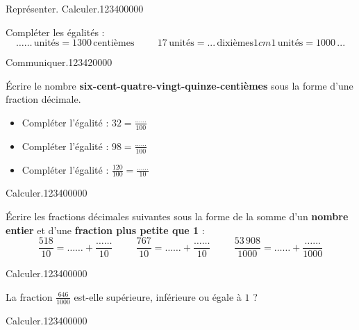 \begin{pageAD} 
 

\begin{ExoCad}{Représenter. Calculer.}{1234}{0}{0}{0}{0}{0}


 Compléter les égalités :
$$ \ldots\ldots\,\text{unités}= 1300\, \text{centièmes}\hspace{1cm}17 \,\text{unités}=...\,\text{dixièmes}{1cm}1\,\text{unités}=1000\,...$$


 
\end{ExoCad}

 
  
\begin{ExoCad}{Communiquer.}{1234}{2}{0}{0}{0}{0}

Écrire le nombre \textbf{six-cent-quatre-vingt-quinze-centièmes} sous la forme d'une fraction décimale.
 
 \begin{itemize}
 \item Compléter l'égalité : $32=\frac{\ldots\ldots}{100}$ \vspace{0.2cm}
 \item Compléter l'égalité :  $98=\frac{\ldots\ldots}{100}$\vspace{0.2cm}
 \item Compléter l'égalité :  $\frac{120}{100}=\frac{\ldots\ldots}{10}$\vspace{0.2cm}
 \end{itemize}
 
\end{ExoCad}

 

\begin{ExoCad}{Calculer.}{1234}{0}{0}{0}{0}{0}
 
 Écrire les fractions décimales suivantes sous la forme de la somme d'un \textbf{nombre entier} et d'une \textbf{fraction plus petite que 1} :
 \[\frac{518}{10}=\ldots\ldots+\frac{\ldots\ldots}{10}\hspace{1cm}\frac{767}{10}=\ldots\ldots+\frac{\ldots\ldots}{10}\hspace{1cm}\frac{53\,908}{1000}=\ldots\ldots+\frac{\ldots\ldots}{1000}\]
 
 
\end{ExoCad}

\begin{ExoCad}{Calculer.}{1234}{0}{0}{0}{0}{0}

La fraction $\frac{646}{1000}$ est-elle supérieure, inférieure ou égale à $1$ ? 
 
\end{ExoCad}



\begin{ExoCad}{Calculer.}{1234}{0}{0}{0}{0}{0}

 
\end{ExoCad}

 
 
\end{pageAD}

